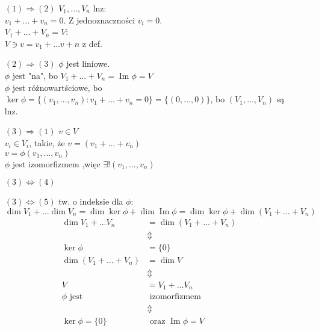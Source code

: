 \begin{dd}  \hfill
    \begin{itemize} 
        \item[$(1) \Rightarrow (2)$] $V_1,\ldots,V_n$ lnz: \\ 
            $v_1 + \ldots + v_n = 0$. Z jednoznaczności $v_i = 0$. \\ 
            $V_1 + \ldots + V_n = V$: \\ 
            $V \ni v = v_1 + \ldots v+n$ z def.
        \item [$(2) \Rightarrow (3)$] $\phi$ jest liniowe. \\ 
            $\phi$ jest "na", bo $V_1+\ldots+V_n = \operatorname{Im} \phi = V$ \\ 
            $\phi$ jest różnowartściowe, bo $\ker \phi = \{ (v_1,\ldots,v_n): v_1+\ldots+v_n = 0\} = 
            \{(0,\ldots,0)\}$, bo $(V_1,\ldots,V_n)$ są lnz. 
        \item [$(3) \Rightarrow (1)$] $v \in V$ \\ 
            $v_i \in V_i$, takie, że $v = (v_1 + \ldots + v_n)$ \\ 
            $v = \phi (v_1,\ldots,v_n)$ \\ 
            $\phi$ jest izomorfizmem ,więc $\exists ! (v_1,\ldots,v_n)$ 
        \item [$(3) \Leftrightarrow (4)$] 
        \item [$(3) \Leftrightarrow (5)$] tw. o indeksie dla $\phi$: \\ 
            $\dim V_1 + \ldots \dim V_n = \dim \ker \phi + \dim \operatorname{Im} \phi = 
            \dim \ker \phi + \dim (V_1+\ldots+V_n)$
            \begin{align*} 
                \dim V_1 + \ldots V_n &= \dim (V_1 + \ldots + V_n) \\ 
                &\Updownarrow  \\ 
                \ker \phi &= \{ 0\} \\ 
                \dim (V_1 + \ldots + V_n) &= \dim V \\ 
                &\Updownarrow \\ 
                V &= V_1 + \ldots V_n \\
                \phi \text{ jest} &\text{ izomorfizmem} \\ 
                 &\Updownarrow \\ 
                \ker \phi = \{ 0\} &\text{ oraz } \operatorname{Im} \phi = V
            \end{align*}  
    \end{itemize} 
\end{dd} 
